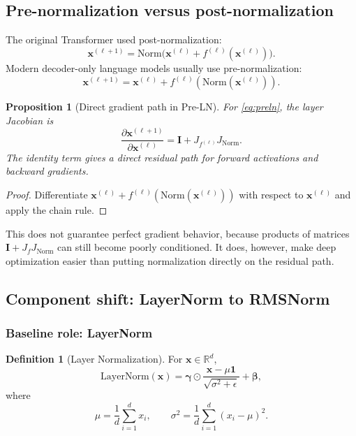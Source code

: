 \documentclass[11pt,a4paper]{article}
\theoremstyle{definition}
\newtheorem{definition}{Definition}[section]
\theoremstyle{plain}
\newtheorem{proposition}{Proposition}[section]
\newcommand{\vx}{\bm{x}}
\newcommand{\mI}{\bm{I}}
\newcommand{\reals}{\mathbb{R}}
\begin{document}
\subsection{Pre-normalization versus post-normalization}

The original Transformer used post-normalization:
\begin{equation}
    \vx^{(\ell+1)}=\mathrm{Norm}\bigl(\vx^{(\ell)}+f^{(\ell)}(\vx^{(\ell)})\bigr).
\end{equation}
Modern decoder-only language models usually use pre-normalization:
\begin{equation}\label{eq:preln}
    \vx^{(\ell+1)}=\vx^{(\ell)}+f^{(\ell)}(\mathrm{Norm}(\vx^{(\ell)})).
\end{equation}

\begin{proposition}[Direct gradient path in Pre-LN]
For \cref{eq:preln}, the layer Jacobian is
\begin{equation}
    \frac{\partial\vx^{(\ell+1)}}{\partial\vx^{(\ell)}}
    =\mI+J_{f^{(\ell)}}J_{\mathrm{Norm}}.
\end{equation}
The identity term gives a direct residual path for forward activations and backward gradients.
\end{proposition}

\begin{proof}
Differentiate $\vx^{(\ell)}+f^{(\ell)}(\mathrm{Norm}(\vx^{(\ell)}))$ with respect to $\vx^{(\ell)}$ and apply the chain rule.
\end{proof}

This does not guarantee perfect gradient behavior, because products of matrices $\mI+J_fJ_{\mathrm{Norm}}$ can still become poorly conditioned. It does, however, make deep optimization easier than putting normalization directly on the residual path.

\subsection{Component shift: LayerNorm to RMSNorm}

\subsubsection{Baseline role: LayerNorm}

\begin{definition}[Layer Normalization]
For $\vx\in\reals^d$,
\begin{equation}\label{eq:layernorm}
    \mathrm{LayerNorm}(\vx)
    =\bm{\gamma}\odot\frac{\vx-\mu\mathbf{1}}{\sqrt{\sigma^2+\epsilon}}+\bm{\beta},
\end{equation}
where
\begin{equation}
    \mu=\frac{1}{d}\sum_{i=1}^{d}x_i,
    \qquad
    \sigma^2=\frac{1}{d}\sum_{i=1}^{d}(x_i-\mu)^2.
\end{equation}
\end{definition}
\end{document}

